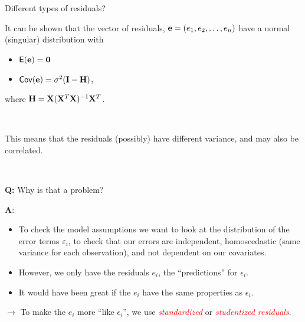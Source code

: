 \documentclass[
  10pt,
  ignorenonframetext,
]{beamer}
\providecommand{\tightlist}{%
  \setlength{\itemsep}{0pt}\setlength{\parskip}{0pt}}
\begin{document}
\begin{frame}
\begin{block}{Different types of residuals?}
\protect\hypertarget{different-types-of-residuals}{}
\(~\)

It can be shown that the vector of residuals,
\({\bf e}=(e_1,e_2,\ldots,e_n)\) have a normal (singular) distribution
with

\vspace{2mm}

\begin{itemize}
\tightlist
\item
  \(\mathsf{E}({\bf e})={\bf 0}\)
\item
  \(\mathsf{Cov}({\bf e})=\sigma^2({\bf I}-{\bf H})\),
\end{itemize}

\vspace{2mm}

where \({\bf H}={\bf X}({\bf X}^T{\bf X})^{-1}{\bf X}^T\).

\(~\)

This means that the residuals (possibly) have different variance, and
may also be correlated.

\(~\)

\textbf{Q:} Why is that a problem?
\end{block}
\end{frame}

\begin{frame}
\textbf{A}:

\begin{itemize}
\item
  To check the model assumptions we want to look at the distribution of
  the error terms \(\varepsilon_i\), to check that our errors are
  independent, homoscedastic (same variance for each observation), and
  not dependent on our covariates.
\item
  However, we only have the residuals \(e_i\), the ``predictions'' for
  \(\epsilon_i\).
\item
  It would have been great if the \(e_i\) have the same properties as
  \(\epsilon_i\).
\end{itemize}

\vspace{2mm}

\(\rightarrow\) To make the \(e_i\) more ``like \(\epsilon_i\)'', we use
\emph{\textcolor{red}{standardized}} or
\emph{\textcolor{red}{studentized residuals}}.
\end{frame}
\end{document}

